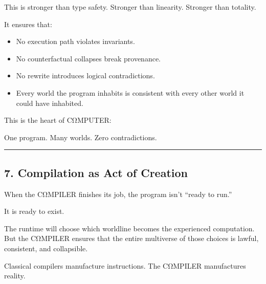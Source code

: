This is stronger than type safety. Stronger than linearity. Stronger
than totality.

It ensures that:

\begin{itemize}
\tightlist
\item
  No execution path violates invariants.
\item
  No counterfactual collapses break provenance.
\item
  No rewrite introduces logical contradictions.
\item
  Every world the program inhabits is consistent with every other world
  it could have inhabited.
\end{itemize}

This is the heart of CΩMPUTER:

One program. Many worlds. Zero contradictions.

\begin{center}\rule{0.5\linewidth}{0.5pt}\end{center}

\subsection{7. Compilation as Act of
Creation}\label{compilation-as-act-of-creation}

When the CΩMPILER finishes its job, the program isn't ``ready to run.''

It is ready to exist.

The runtime will choose which worldline becomes the experienced
computation. But the CΩMPILER ensures that the entire multiverse of
those choices is lawful, consistent, and collapsible.

Classical compilers manufacture instructions. The CΩMPILER manufactures
reality.
